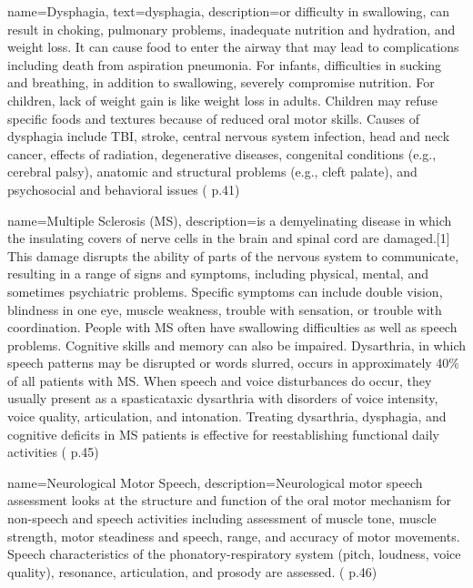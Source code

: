  {
	name={Dysphagia}, 
	text={dysphagia},
	description={or difficulty in swallowing, can result in choking, pulmonary problems, inadequate nutrition and hydration, and weight loss. It can cause food to enter the airway that may lead to complications including death from aspiration pneumonia. For infants, difficulties in sucking and breathing, in addition to swallowing, severely compromise nutrition. For children, lack of weight gain is like weight loss in adults. Children may refuse specific foods and textures because of reduced oral motor skills. Causes of dysphagia include TBI, stroke, central nervous system infection, head and neck cancer, effects of radiation, degenerative diseases, congenital conditions (e.g., cerebral palsy), anatomic and structural problems (e.g., cleft palate), and psychosocial and behavioral issues (\cite{SLPathologies} p.41)
}
}

 {
	name={Multiple Sclerosis (MS)}, 
	description={is a demyelinating disease in which the insulating covers of nerve cells in the brain and spinal cord are damaged.[1] This damage disrupts the ability of parts of the nervous system to communicate, resulting in a range of signs and symptoms, including physical, mental, and sometimes psychiatric problems. Specific symptoms can include double vision, blindness in one eye, muscle weakness, trouble with sensation, or trouble with coordination. People with MS often have swallowing difficulties as well as speech problems. Cognitive skills and memory can also be impaired. Dysarthria, in which speech patterns may be disrupted or words slurred, occurs in approximately 40\% of all patients with MS. When speech and voice disturbances do occur, they usually present as a spasticataxic dysarthria with disorders of voice intensity, voice quality, articulation, and intonation. Treating dysarthria, dysphagia, and cognitive deficits in MS patients is effective for reestablishing functional daily activities (\cite{SLPathologies} p.45)
}%
}


 {
	name={Neurological Motor Speech}, 
	description={Neurological motor speech assessment looks at the structure and function of the oral motor mechanism for non-speech and speech activities including assessment of muscle tone, muscle strength, motor steadiness and speech, range, and accuracy of motor movements. Speech characteristics of the phonatory-respiratory system (pitch, loudness, voice quality), resonance, articulation, and prosody are assessed. (\cite{SLPathologies} p.46)
}
}

